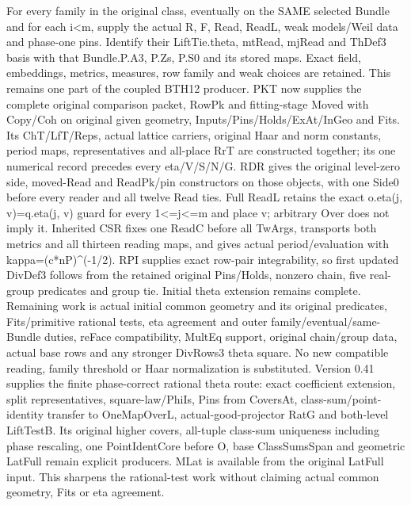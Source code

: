 For every family in the original class, eventually on the SAME selected Bundle and for each i<m, supply the actual R,\allowbreak{} F,\allowbreak{} Read,\allowbreak{} ReadL, weak models/\allowbreak{}Weil data and phase-one pins. Identify their LiftTie.theta, mtRead, mjRead and ThDef3 basis with that Bundle.P.A3, P.Zs, P.S0 and its stored maps. Exact field, embeddings, metrics, measures, row family and weak choices are retained. This remains one part of the coupled BTH12 producer. PKT now supplies the complete original comparison packet, RowPk and fitting-stage Moved with Copy/\allowbreak{}Coh on original given geometry, Inputs/\allowbreak{}Pins/\allowbreak{}Holds/\allowbreak{}ExAt/\allowbreak{}InGeo and Fits. Its ChT/\allowbreak{}LfT/\allowbreak{}Reps, actual lattice carriers, original Haar and norm constants, period maps, representatives and all-place RrT are constructed together; its one numerical record precedes every eta/\allowbreak{}V/\allowbreak{}S/\allowbreak{}N/\allowbreak{}G. RDR gives the original level-zero side, moved-Read and ReadPk/\allowbreak{}pin constructors on those objects, with one Side0 before every reader and all twelve Read ties. Full ReadL retains the exact o.eta(j,\allowbreak{} v)=q.eta(j,\allowbreak{} v) guard for every 1<=j<=m and place v; arbitrary Over does not imply it. Inherited CSR fixes one ReadC before all TwArgs, transports both metrics and all thirteen reading maps, and gives actual period/\allowbreak{}evaluation with kappa=(c*nP)\textasciicircum{}(-1/\allowbreak{}2). RPI supplies exact row-pair integrability, so first updated DivDef3 follows from the retained original Pins/\allowbreak{}Holds, nonzero chain, five real-group predicates and group tie. Initial theta extension remains complete. Remaining work is actual initial common geometry and its original predicates, Fits/\allowbreak{}primitive rational tests, eta agreement and outer family/\allowbreak{}eventual/\allowbreak{}same-Bundle duties, reFace compatibility, MultEq support, original chain/\allowbreak{}group data, actual base rows and any stronger DivRows3 theta square. No new compatible reading, family threshold or Haar normalization is substituted. Version 0.41 supplies the finite phase-correct rational theta route: exact coefficient extension, split representatives, square-law/\allowbreak{}PhiIs, Pins from CoversAt, class-sum/\allowbreak{}point-identity transfer to OneMapOverL, actual-good-projector RatG and both-level LiftTestB. Its original higher covers, all-tuple class-sum uniqueness including phase rescaling, one PointIdentCore before O, base ClassSumsSpan and geometric LatFull remain explicit producers. MLat is available from the original LatFull input. This sharpens the rational-test work without claiming actual common geometry, Fits or eta agreement.


